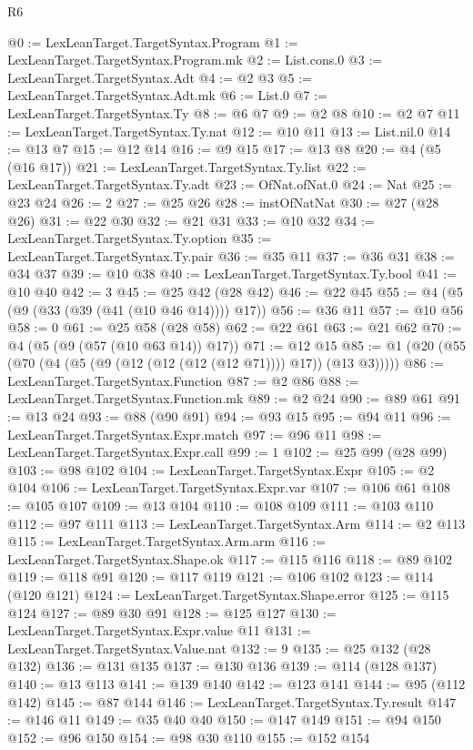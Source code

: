 \begin{lexlean}{R6}
\begin{coremodule}
@0 := LexLeanTarget.TargetSyntax.Program
@1 := LexLeanTarget.TargetSyntax.Program.mk
@2 := List.cons.{0}
@3 := LexLeanTarget.TargetSyntax.Adt
@4 := @2 @3
@5 := LexLeanTarget.TargetSyntax.Adt.mk
@6 := List.{0}
@7 := LexLeanTarget.TargetSyntax.Ty
@8 := @6 @7
@9 := @2 @8
@10 := @2 @7
@11 := LexLeanTarget.TargetSyntax.Ty.nat
@12 := @10 @11
@13 := List.nil.{0}
@14 := @13 @7
@15 := @12 @14
@16 := @9 @15
@17 := @13 @8
@20 := @4 (@5 (@16 @17))
@21 := LexLeanTarget.TargetSyntax.Ty.list
@22 := LexLeanTarget.TargetSyntax.Ty.adt
@23 := OfNat.ofNat.{0}
@24 := Nat
@25 := @23 @24
@26 := 2
@27 := @25 @26
@28 := instOfNatNat
@30 := @27 (@28 @26)
@31 := @22 @30
@32 := @21 @31
@33 := @10 @32
@34 := LexLeanTarget.TargetSyntax.Ty.option
@35 := LexLeanTarget.TargetSyntax.Ty.pair
@36 := @35 @11
@37 := @36 @31
@38 := @34 @37
@39 := @10 @38
@40 := LexLeanTarget.TargetSyntax.Ty.bool
@41 := @10 @40
@42 := 3
@45 := @25 @42 (@28 @42)
@46 := @22 @45
@55 := @4 (@5 (@9 (@33 (@39 (@41 (@10 @46 @14)))) @17))
@56 := @36 @11
@57 := @10 @56
@58 := 0
@61 := @25 @58 (@28 @58)
@62 := @22 @61
@63 := @21 @62
@70 := @4 (@5 (@9 (@57 (@10 @63 @14)) @17))
@71 := @12 @15
@85 := @1 (@20 (@55 (@70 (@4 (@5 (@9 (@12 (@12 (@12 (@12 @71)))) @17)) (@13 @3)))))
@86 := LexLeanTarget.TargetSyntax.Function
@87 := @2 @86
@88 := LexLeanTarget.TargetSyntax.Function.mk
@89 := @2 @24
@90 := @89 @61
@91 := @13 @24
@93 := @88 (@90 @91)
@94 := @93 @15
@95 := @94 @11
@96 := LexLeanTarget.TargetSyntax.Expr.match
@97 := @96 @11
@98 := LexLeanTarget.TargetSyntax.Expr.call
@99 := 1
@102 := @25 @99 (@28 @99)
@103 := @98 @102
@104 := LexLeanTarget.TargetSyntax.Expr
@105 := @2 @104
@106 := LexLeanTarget.TargetSyntax.Expr.var
@107 := @106 @61
@108 := @105 @107
@109 := @13 @104
@110 := @108 @109
@111 := @103 @110
@112 := @97 @111
@113 := LexLeanTarget.TargetSyntax.Arm
@114 := @2 @113
@115 := LexLeanTarget.TargetSyntax.Arm.arm
@116 := LexLeanTarget.TargetSyntax.Shape.ok
@117 := @115 @116
@118 := @89 @102
@119 := @118 @91
@120 := @117 @119
@121 := @106 @102
@123 := @114 (@120 @121)
@124 := LexLeanTarget.TargetSyntax.Shape.error
@125 := @115 @124
@127 := @89 @30 @91
@128 := @125 @127
@130 := LexLeanTarget.TargetSyntax.Expr.value @11
@131 := LexLeanTarget.TargetSyntax.Value.nat
@132 := 9
@135 := @25 @132 (@28 @132)
@136 := @131 @135
@137 := @130 @136
@139 := @114 (@128 @137)
@140 := @13 @113
@141 := @139 @140
@142 := @123 @141
@144 := @95 (@112 @142)
@145 := @87 @144
@146 := LexLeanTarget.TargetSyntax.Ty.result
@147 := @146 @11
@149 := @35 @40 @40
@150 := @147 @149
@151 := @94 @150
@152 := @96 @150
@154 := @98 @30 @110
@155 := @152 @154

\end{coremodule}
\end{lexlean}
